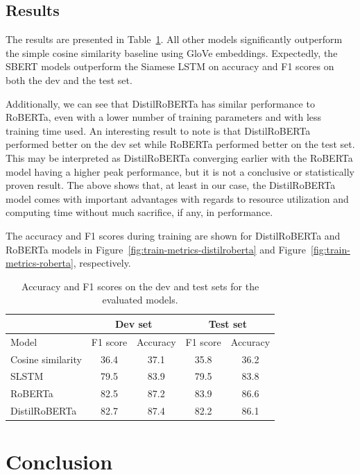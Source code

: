 \documentclass[10pt, a4paper]{article}
\begin{document}
\subsection{Results} \label{results}

The results are presented in Table~\ref{tab:results}.
All other models significantly outperform the simple cosine similarity baseline using GloVe embeddings.
Expectedly, the SBERT models outperform the Siamese LSTM on accuracy and F1 scores on both the dev and the test set.

Additionally, we can see that DistilRoBERTa has similar performance to RoBERTa, even with a lower number of training parameters and with less training time used.
An interesting result to note is that DistilRoBERTa performed better on the dev set while RoBERTa performed better on the test set.
This may be interpreted as DistilRoBERTa converging earlier with the RoBERTa model having a higher peak performance, but it is not a conclusive or statistically proven result.
The above shows that, at least in our case, the DistilRoBERTa model comes with important advantages with regards to resource utilization and computing time without much sacrifice, if any, in performance.

The accuracy and F1 scores during training are shown for DistilRoBERTa and RoBERTa models in Figure~\ref{fig:train-metrics-distilroberta} and Figure~\ref{fig:train-metrics-roberta}, respectively.

\begin{table}
\caption{Accuracy and F1 scores on the dev and test sets for the evaluated models.}
\label{tab:results}
\begin{center}
\begin{tabular}{lcccc}
\toprule
 & \multicolumn{2}{c}{Dev set} & \multicolumn{2}{c}{Test set} \\
\midrule
Model & F1 score & Accuracy & F1 score & Accuracy \\
\midrule
Cosine similarity & 36.4 & 37.1 & 35.8 & 36.2 \\
SLSTM & 79.5 & 83.9 & 79.5 & 83.8 \\
RoBERTa & 82.5 & 87.2 & 83.9 & 86.6 \\
DistilRoBERTa & 82.7 & 87.4 & 82.2 & 86.1 \\
\bottomrule
\end{tabular}
\end{center}
\end{table}

\section{Conclusion} \label{conclusion}
\end{document}
